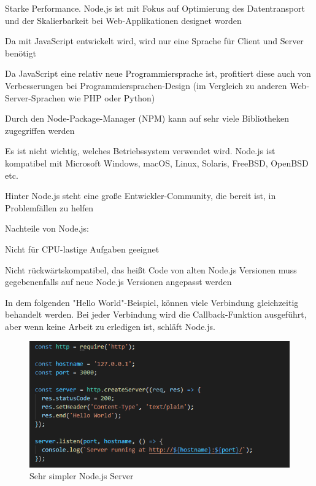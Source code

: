 \begin{compactitem}
  \item Starke Performance. Node.js ist mit Fokus auf Optimierung des Datentransport und der Skalierbarkeit bei Web-Applikationen designet worden
  \item Da mit JavaScript entwickelt wird, wird nur eine Sprache für Client und Server benötigt
  \item Da JavaScript eine relativ neue Programmiersprache ist, profitiert diese auch von Verbesserungen bei Programmiersprachen-Design (im Vergleich zu anderen Web-Server-Sprachen wie PHP oder Python)
  \item Durch den Node-Package-Manager (NPM) kann auf sehr viele Bibliotheken zugegriffen werden
  \item Es ist nicht wichtig, welches Betriebssystem verwendet wird. Node.js ist kompatibel mit Microsoft Windows, macOS, Linux, Solaris, FreeBSD, OpenBSD etc.
  \item Hinter Node.js steht eine große Entwickler-Community, die bereit ist, in Problemfällen zu helfen
\end{compactitem}

Nachteile von Node.js: \cite{nodejs_nachteile}

\begin{compactitem}
  \item Nicht für CPU-lastige Aufgaben geeignet
  \item Nicht rückwärtskompatibel, das heißt Code von alten Node.js Versionen muss gegebenenfalls auf neue Node.js Versionen angepasst werden
\end{compactitem}

In dem folgenden "Hello World"-Beispiel, können viele Verbindung gleichzeitig behandelt werden. Bei jeder Verbindung wird die Callback-Funktion ausgeführt, aber wenn keine Arbeit zu erledigen ist, schläft Node.js.

\begin{figure}[H]
  \centering
  \includegraphics[scale=1]{pics/node js.PNG}
  \caption{Sehr simpler Node.js Server}
\end{figure}

